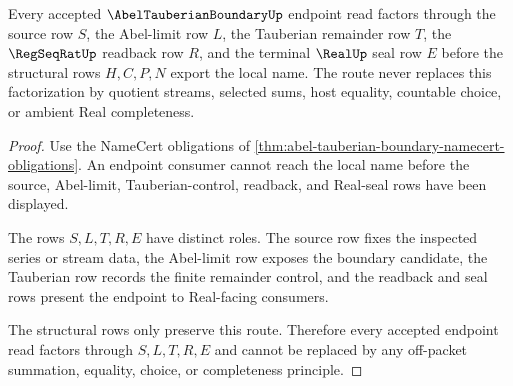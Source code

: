 \begin{theorem}
\label{thm:abel-tauberian-boundary-real-route}
Every accepted $\AbelTauberianBoundaryUp$ endpoint read factors through the source row $S$, the Abel-limit row $L$, the Tauberian remainder row $T$, the $\RegSeqRatUp$ readback row $R$, and the terminal $\RealUp$ seal row $E$ before the structural rows $H,C,P,N$ export the local name. The route never replaces this factorization by quotient streams, selected sums, host equality, countable choice, or ambient Real completeness.
\end{theorem}
\begin{proof}
Use the NameCert obligations of \autoref{thm:abel-tauberian-boundary-namecert-obligations}. An endpoint consumer cannot reach the local name before the source, Abel-limit, Tauberian-control, readback, and Real-seal rows have been displayed.

The rows $S,L,T,R,E$ have distinct roles. The source row fixes the inspected series or stream data, the Abel-limit row exposes the boundary candidate, the Tauberian row records the finite remainder control, and the readback and seal rows present the endpoint to Real-facing consumers.

The structural rows only preserve this route. Therefore every accepted endpoint read factors through $S,L,T,R,E$ and cannot be replaced by any off-packet summation, equality, choice, or completeness principle.
\end{proof}




